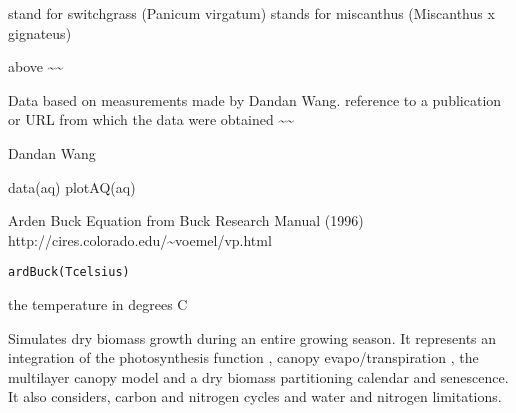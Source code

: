 \documentclass[letterpaper]{book}
\begin{document}
%
\begin{Details}\relax
{} stand for switchgrass (Panicum virgatum)
 stands for miscanthus (Miscanthus x gignateus)


above \textasciitilde{}\textasciitilde{}
\end{Details}
%
\begin{Source}\relax
Data based on measurements made by Dandan Wang. 
reference to a publication or URL from which the data were
obtained \textasciitilde{}\textasciitilde{}
\end{Source}
%
\begin{References}\relax
Dandan Wang 
\end{References}
%
\begin{Examples}
\begin{ExampleCode}
data(aq)
plotAQ(aq)
\end{ExampleCode}
\end{Examples}
%
\begin{Description}\relax
Arden Buck Equation from Buck Research Manual (1996)
http://cires.colorado.edu/\textasciitilde{}voemel/vp.html
\end{Description}
%
\begin{Usage}
\begin{verbatim}
ardBuck(Tcelsius)
\end{verbatim}
\end{Usage}
%
\begin{Arguments}
\begin{ldescription}
\item[\code{Tcelsius}] the temperature in degrees C
\end{ldescription}
\end{Arguments}
%
\begin{Description}\relax
Simulates dry biomass growth during an entire growing
season.  It represents an integration of the photosynthesis
function , canopy evapo/transpiration
, the multilayer canopy model
 and a dry biomass partitioning calendar
and senescence. It also considers, carbon and nitrogen
cycles and water and nitrogen limitations.
\end{Description}
\end{document}
